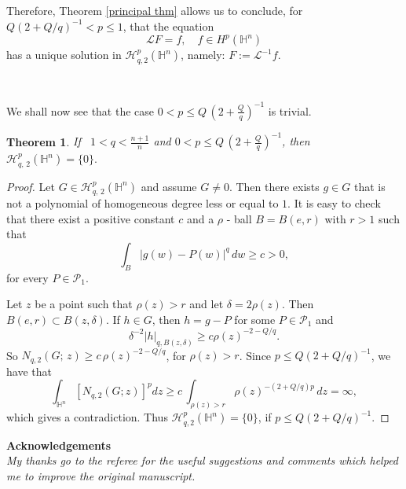 \documentclass[reqno,10pt]{article}
\newtheorem{theorem}{Theorem}
\theoremstyle{definition}
\numberwithin{equation}{section}
\numberwithin{theorem}{section}
\begin{document}
Therefore, Theorem \ref{principal thm} allows us to conclude, for $Q(2+Q/q)^{-1} < p \leq 1$, that the equation
\[ 
\mathcal{L} F = f, \,\,\,\,\,\, f \in H^p(\mathbb{H}^n) 
\]
has a unique solution in $\mathcal{H}^{p}_{q, 2}(\mathbb{H}^{n})$, namely: $F := \mathcal{L}^{-1}f$.

\

We shall now see that the case $0 < p \leq Q \, (2 + \frac{Q}{q})^{-1}$ is trivial.

\begin{theorem} \label{2nd thm}
If \, $1 < q < \frac{n+1}{n}$ and $0 < p \leq Q \, (2 + \frac{Q}{q})^{-1}$, then $\mathcal{H}^{p}_{q, \, 2}(\mathbb{H}^{n}) = \{ 0 \}.$
\end{theorem}

\begin{proof} Let $G \in \mathcal{H}^{p}_{q, \, 2}(\mathbb{H}^{n})$ and assume $G \neq 0$. Then there exists $g \in G$ 
that is not a polynomial of homogeneous degree less or equal to $1$. It is easy to check that there exist a positive constant $c$ and 
a $\rho$ - ball $B = B(e, r)$ with $r > 1$ such that
\[
\int_{B} |g(w) - P(w)|^{q} \, dw \geq c > 0,
\]
for every $P \in \mathcal{P}_{1}$.

Let $z$ be a point such that $\rho(z) > r$ and let $\delta = 2 \rho(z)$. Then $B(e, r) \subset B(z, \delta)$. If $h \in G$, then 
$h = g - P$ for some $P \in \mathcal{P}_{1}$ and
\[
\delta^{-2}|h|_{q, B(z, \delta)} \geq c \rho(z)^{-2-Q/q}.
\]
So $N_{q,2}(G; \, z) \geq c \, \rho(z)^{-2-Q/q}$, for $\rho(z) > r$. Since $p \leq Q(2+Q/q)^{-1}$, we have that
\[
\int_{\mathbb{H}^n} [N_{q,2}(G; z)]^p dz \geq c \, \int_{\rho(z) > r} \rho(z)^{-(2+Q/q)p} \, dz = \infty,
\]
which gives a contradiction. Thus $\mathcal{H}^{p}_{q, 2}(\mathbb{H}^{n}) = \{0\}$, if $p \leq Q(2+Q/q)^{-1}$.
\end{proof}

\noindent\textbf{Acknowledgements}\\
\textit{My thanks go to the referee for the useful suggestions and comments which helped me to improve the original manuscript.}
\end{document}
